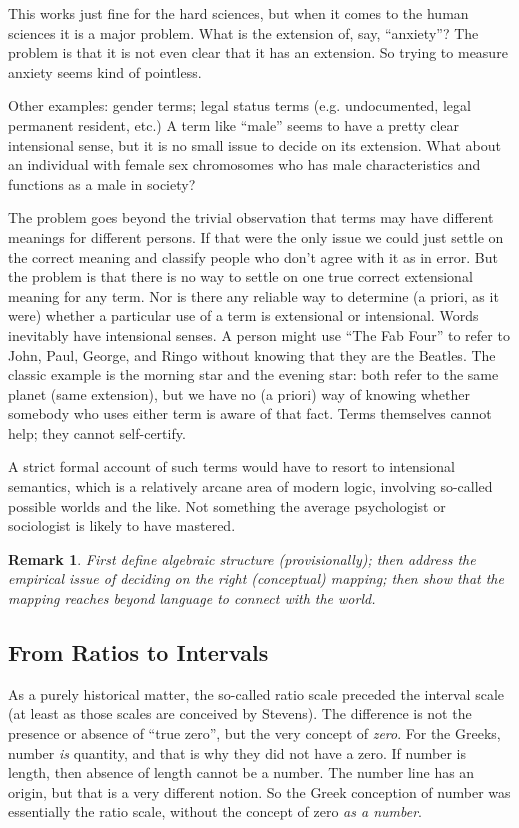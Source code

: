 \documentclass[11pt,twoside]{article}
\newtheorem{remark}{Remark}
\begin{document}
This works just fine for the hard sciences, but when it comes to the
human sciences it is a major problem.  What is the extension of, say,
``anxiety''?  The problem is that it is not even clear that it has an
extension.  So trying to measure anxiety seems kind of pointless.

Other examples: gender terms; legal status terms (e.g. undocumented,
legal permanent resident, etc.)  A term like ``male'' seems to have a
pretty clear intensional sense, but it is no small issue to decide on
its extension.  What about an individual with female sex chromosomes
who has male characteristics and functions as a male in society?

The problem goes beyond the trivial observation that terms may have
different meanings for different persons.  If that were the only issue
we could just settle on the correct meaning and classify people who
don't agree with it as in error.  But the problem is that there is no
way to settle on one true correct extensional meaning for any term.
Nor is there any reliable way to determine (a priori, as it were)
whether a particular use of a term is extensional or intensional.
Words inevitably have intensional senses.  A person might use ``The
Fab Four'' to refer to John, Paul, George, and Ringo without knowing
that they are the Beatles.  The classic example is the morning star
and the evening star: both refer to the same planet (same extension),
but we have no (a priori) way of knowing whether somebody who uses
either term is aware of that fact.  Terms themselves cannot help; they
cannot self-certify.

A strict formal account of such terms would have to resort to
intensional semantics, which is a relatively arcane area of modern
logic, involving so-called possible worlds and the like.  Not
something the average psychologist or sociologist is likely to have
mastered.

\begin{remark}
  First define algebraic structure (provisionally); then address the
  empirical issue of deciding on the right (conceptual) mapping; then
  show that the mapping reaches beyond language to connect with the
  world.
\end{remark}

\subsection{From Ratios to Intervals}

As a purely historical matter, the so-called ratio scale preceded the
interval scale (at least as those scales are conceived by Stevens).
The difference is not the presence or absence of ``true zero'', but
the very concept of \textit{zero}.  For the Greeks, number \textit{is}
quantity, and that is why they did not have a zero.  If number is
length, then absence of length cannot be a number.  The number line
has an origin, but that is a very different notion.  So the Greek
conception of number was essentially the ratio scale, without the
concept of zero \textit{as a number}.
\end{document}
